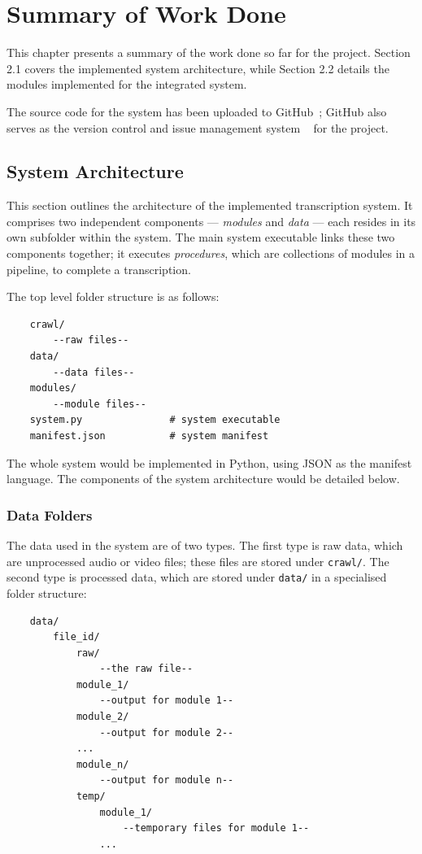 \chapter{Summary of Work Done}

This chapter presents a summary of the work done so far for the project.
Section 2.1 covers the implemented system architecture, while Section 2.2
details the modules implemented for the integrated system.

The source code for the system has been uploaded to GitHub~\cite{gh-magor};
GitHub also serves as the version control and issue management system
~\cite{gh-magor-is} for the project.

\section{System Architecture}

This section outlines the architecture of the implemented transcription system.
 It comprises two independent components --- \textit{modules} and \textit{data} 
--- each resides in its own subfolder within the system. The main system 
executable links these two components together; it executes \textit{procedures},
which are collections of modules in a pipeline, to complete a transcription.

The top level folder structure is as follows:

\begin{lstlisting}
    crawl/
        --raw files--
    data/
        --data files--
    modules/
        --module files--
    system.py               # system executable
    manifest.json           # system manifest
\end{lstlisting}

The whole system would be implemented in Python, using JSON as the manifest
language. The components of the system architecture would be detailed below.

\subsection{Data Folders}

The data used in the system are of two types. The first type is raw data, 
which are unprocessed audio or video files; these files are stored under
\texttt{crawl/}. The second type is processed data, which are stored under
\texttt{data/} in a specialised folder structure:

\begin{lstlisting}
    data/
        file_id/
            raw/
                --the raw file--
            module_1/
                --output for module 1--
            module_2/
                --output for module 2--
            ...
            module_n/
                --output for module n--
            temp/
                module_1/
                    --temporary files for module 1--
                ...
\end{lstlisting}

